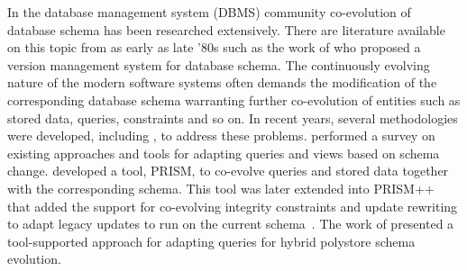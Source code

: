 In the database management system (DBMS) community co-evolution of database schema has been researched extensively. There are literature available on this topic from as early as late '80s such as the work of \textcite{andany1991management} who proposed a version management system for database schema. The continuously evolving nature of the modern software systems often demands the modification of the corresponding database schema warranting further co-evolution of entities such as stored data, queries, constraints and so on. In recent years, several methodologies were developed, including \cite{younggook2005, HICK2006534, curino2010, Curino2008}, to address these problems. \Textcite{Caruccio2016} performed a survey on existing approaches and tools for adapting queries and views based on schema change. \Textcite{Curino2008} developed a tool, PRISM, to co-evolve queries and stored data together with the corresponding schema. This tool was later extended into PRISM++ that added the support for co-evolving integrity constraints and update rewriting to adapt legacy updates to run on the current schema~\cite{curino2010}. The work of \textcite{Fink2020} presented a tool-supported approach for adapting queries for hybrid polystore schema evolution. 
